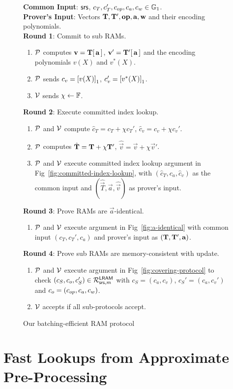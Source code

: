 \begin{figure}[tb!]
\begin{mdframed}
        {\bf Common Input}: $\mathsf{srs}$, $c_T, c_T', c_{op}, c_a, c_w\in \mathbb{G}_1$.\\
        {\bf Prover's Input}: Vectors $\mathbf{T},\mathbf{T}',\mathbf{{op}},\mathbf{a},\mathbf{w}$ and their encoding polynomials.\\

        {\bf Round 1}: Commit to sub RAMs.
        \begin{enumerate}[leftmargin=1em, label=\arabic*.]
            \item $\mathcal{P}$ computes $\mathbf{v}=\mathbf{T}[\,\mathbf{a}\,]$, $\mathbf{v}'=\mathbf{T}'[\,\mathbf{a}\,]$ and the encoding
            polynomials $v(X)$ and $v^*(X)$.
            \item $\mathcal{P}$ sends $c_v = \left[{v(X)}\right]_1$, $c_v'=\left[{v^*(X)}\right]_1$.
            \item $\mathcal{V}$ sends $\chi\gets \mathbb{F}$.
        \end{enumerate}

        {\bf Round 2}: Execute committed index lookup.
        \begin{enumerate}[leftmargin=1em, label=\arabic*.]
            \item $\mathcal{P}$ and $\mathcal{V}$ compute $\hat{c}_T=c_T + \chi c_T'$, $\hat{c}_v=c_v + \chi c_v'$.
            \item $\mathcal{P}$ computes $\hat{\mathbf{T}} = \mathbf{T} + \chi \mathbf{T}'$, $\hat{\vec{v}}= \vec{v} + \chi \vec{v}'$.
            \item $\mathcal{P}$ and $\mathcal{V}$ execute committed index lookup argument in Fig~\ref{fig:committed-index-lookup},
            with $(\hat{c}_T,c_a,\hat{c}_v)$ as the common input and $(\hat{\vec{T}}, \vec{a},\hat{\vec{v}})$ as prover's input.
        \end{enumerate}

        {\bf Round 3}: Prove RAMs are $\vec{a}$-identical.
        \begin{enumerate}[leftmargin=1em, label=\arabic*.]
            \item $\mathcal{P}$ and $\mathcal{V}$ execute argument in Fig~\ref{fig:a-identical} with common input
            $(c_T,c_T',c_a)$ and prover's input as $(\mathbf{T},\mathbf{T}',\mathbf{a})$.
        \end{enumerate}

        {\bf Round 4}: Prove sub RAMs are memory-consistent with update.
        \begin{enumerate}[leftmargin=1em, label=\arabic*.]
        \item $\mathcal{P}$ and $\mathcal{V}$ execute argument in Fig~\ref{fig:covering-protocol}
        to check $(c_S, c_o, c_S')\in \mathcal{R}^{\mathsf{LRAM}}_{\mathsf{srs},m}$ with $c_S = (c_a, c_v)$, $c_S'=(c_a, c_v')$ and
        $c_o=(c_{op},c_a,c_w)$.
        \item $\mathcal{V}$ accepts if all sub-protocols accept.
        \end{enumerate}
    \end{mdframed}
    \caption{Our batching-efficient RAM protocol}
    \label{fig:complete-listing}
\end{figure}

\section{Fast Lookups from Approximate Pre-Processing}\label{sec:update-protocol}

